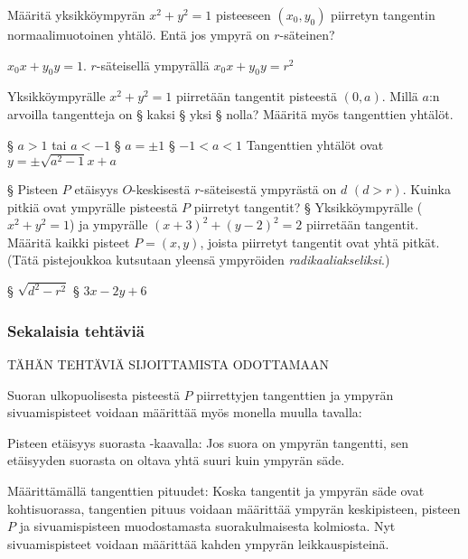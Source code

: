 \begin{tehtavasivu}
\begin{tehtava}
Määritä yksikköympyrän $x^2+y^2= 1$ pisteeseen $(x_{0}, y_{0} )$ piirretyn tangentin normaalimuotoinen yhtälö. Entä jos ympyrä on $r$-säteinen?
\begin{vastaus}
$x_0x+y_0y=1 $. $r$-säteisellä ympyrällä $x_0x+y_0y=r^2$
\end{vastaus}
\end{tehtava}

\begin{tehtava}
Yksikköympyrälle $x^2+y^2=1$ piirretään tangentit pisteestä $(0, a)$. Millä $a$:n arvoilla tangentteja on 
\alakohdat
§ kaksi
§ yksi
§ nolla?
\loppu
Määritä myös tangenttien yhtälöt.
\begin{vastaus}
\alakohdat
§ $a > 1$ tai $a < -1$
§ $a = \pm1$
§ $ -1 < a < 1 $ 
\loppu
Tangenttien yhtälöt ovat $ y = \pm \sqrt{a^2-1}x+a$
\end{vastaus}
\end{tehtava}

\begin{tehtava}
\alakohdat
§ Pisteen $P$ etäisyys $O$-keskisestä $r$-säteisestä ympyrästä on $d$ $(d > r) $. Kuinka pitkiä ovat ympyrälle pisteestä $P$ piirretyt tangentit?
§ Yksikköympyrälle ($x^2+y^2 = 1$) ja ympyrälle $(x+3)^2+(y-2)^2 = 2$ piirretään tangentit. Määritä kaikki pisteet $P = (x,y)$, joista piirretyt tangentit ovat yhtä pitkät. (Tätä pistejoukkoa kutsutaan yleensä ympyröiden \emph{radikaaliakseliksi}.)
\loppu

\begin{vastaus}
\alakohdat
§ $\sqrt{d^2-r^2}$
§ $3x-2y+6$
\loppu
\end{vastaus}
\end{tehtava}

\subsubsection*{Sekalaisia tehtäviä}


TÄHÄN TEHTÄVIÄ SIJOITTAMISTA ODOTTAMAAN

\begin{tehtava}
Suoran ulkopuolisesta pisteestä $P$ piirrettyjen tangenttien ja ympyrän sivuamispisteet voidaan määrittää myös monella muulla tavalla:

Pisteen etäisyys suorasta -kaavalla: Jos suora on ympyrän tangentti, sen etäisyyden suorasta on oltava yhtä suuri kuin ympyrän säde.

Määrittämällä tangenttien pituudet: Koska tangentit ja ympyrän säde ovat kohtisuorassa, tangentien pituus voidaan määrittää ympyrän keskipisteen, pisteen $P$ ja sivuamispisteen muodostamasta suorakulmaisesta kolmiosta. Nyt sivuamispisteet voidaan määrittää kahden ympyrän leikkauspisteinä.


\end{tehtava}
\end{tehtavasivu}
